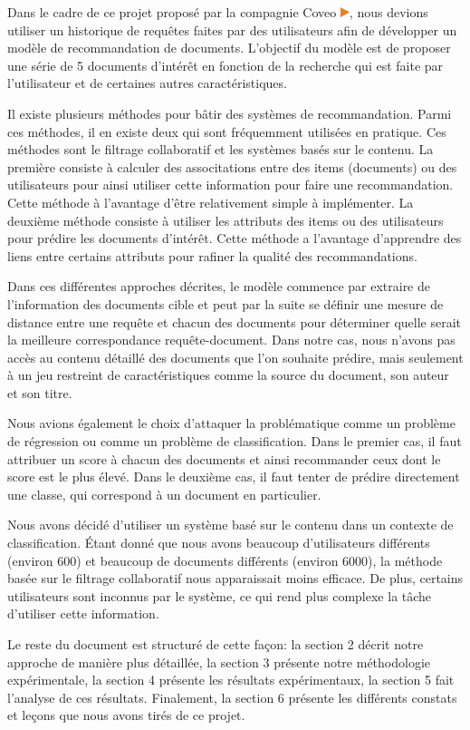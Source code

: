 Dans le cadre de ce projet proposé par la compagnie Coveo \href{https://www.coveo.com/fr}{\includegraphics[height=0.3cm]{coveo_logo}}, nous devions utiliser un historique de requêtes faites par des utilisateurs afin de développer un modèle de recommandation de documents. 
L'objectif du modèle est de proposer une série de 5 documents d'intérêt en fonction de la recherche qui est faite par l'utilisateur et de certaines autres caractéristiques.
\break

Il existe plusieurs méthodes pour bâtir des systèmes de recommandation. Parmi ces méthodes, il en existe deux qui sont fréquemment utilisées en pratique. Ces méthodes sont le filtrage collaboratif et les systèmes basés sur le contenu. La première consiste à calculer des associtations entre des items (documents) ou des utilisateurs pour ainsi utiliser cette information pour faire une recommandation. Cette méthode à l'avantage d'être relativement simple à implémenter. La deuxième méthode consiste à utiliser les attributs des items ou des utilisateurs pour prédire les documents d'intérêt. Cette méthode a l'avantage d'apprendre des liens entre certains attributs pour rafiner la qualité des recommandations.

Dans ces différentes approches décrites, le modèle commence par extraire de l'information des documents cible et peut par la suite se définir une mesure de distance entre une requête et chacun des documents pour déterminer quelle serait la meilleure correspondance requête-document. Dans notre cas, nous n'avons pas accès au contenu détaillé des documents que l'on souhaite prédire, mais seulement à un jeu restreint de caractéristiques comme la source du document, son auteur et son titre.

Nous avions également le choix d'attaquer la problématique comme un problème de régression ou comme un problème de classification. Dans le premier cas, il faut attribuer un score à chacun des documents et ainsi recommander ceux dont le score est le plus élevé. Dans le deuxième cas, il faut tenter de prédire directement une classe, qui correspond à un document en particulier. 

Nous avons décidé d'utiliser un système basé sur le contenu dans un contexte de classification. Étant donné que nous avons beaucoup d'utilisateurs différents (environ 600) et beaucoup de documents différents (environ 6000), la méthode basée sur le filtrage collaboratif nous apparaissait moins efficace. De plus, certains utilisateurs sont inconnus par le système, ce qui rend plus complexe la tâche d'utiliser cette information. 
\break

Le reste du document est structuré de cette façon: la section 2 décrit notre approche de manière plus détaillée, la section 3 présente notre méthodologie expérimentale, la section 4 présente les résultats expérimentaux, la section 5 fait l'analyse de ces résultats. Finalement, la section 6 présente les différents constats et leçons que nous avons tirés de ce projet.